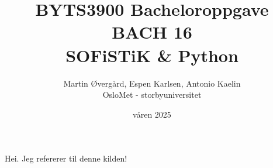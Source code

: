 \documentclass[12pt, norsk]{article}
\title{BYTS3900 Bacheloroppgave \\ BACH 16\\SOFiSTiK \& Python}
\author{Martin Øvergård, Espen Karlsen, Antonio Kaelin\\OsloMet - storbyuniversitet}
\date{våren 2025}
\begin{document}
\maketitle

Hei. Jeg refererer til denne kilden! \parencite[s. 27]{testreferanse}

\printbibliography
\end{document}
